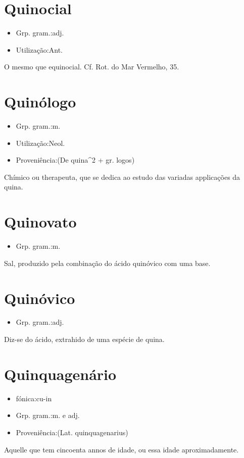 \section{Quinocial}
\begin{itemize}
\item {Grp. gram.:adj.}
\end{itemize}
\begin{itemize}
\item {Utilização:Ant.}
\end{itemize}
O mesmo que \textunderscore equinocial\textunderscore . Cf. \textunderscore Rot. do Mar Vermelho\textunderscore , 35.
\section{Quinólogo}
\begin{itemize}
\item {Grp. gram.:m.}
\end{itemize}
\begin{itemize}
\item {Utilização:Neol.}
\end{itemize}
\begin{itemize}
\item {Proveniência:(De \textunderscore quina\textunderscore ^2 + gr. \textunderscore logos\textunderscore )}
\end{itemize}
Chímico ou therapeuta, que se dedica ao estudo das variadas applicações da quina.
\section{Quinovato}
\begin{itemize}
\item {Grp. gram.:m.}
\end{itemize}
Sal, produzido pela combinação do ácido quinóvico com uma base.
\section{Quinóvico}
\begin{itemize}
\item {Grp. gram.:adj.}
\end{itemize}
Diz-se do ácido, extrahido de uma espécie de quina.
\section{Quinquagenário}
\begin{itemize}
\item {fónica:cu-in}
\end{itemize}
\begin{itemize}
\item {Grp. gram.:m.  e  adj.}
\end{itemize}
\begin{itemize}
\item {Proveniência:(Lat. \textunderscore quinquagenarius\textunderscore )}
\end{itemize}
Aquelle que tem cincoenta annos de idade, ou essa idade aproximadamente.
